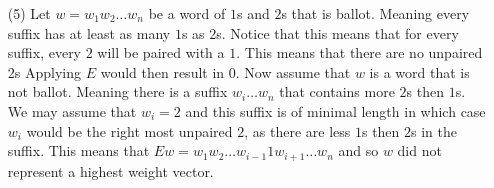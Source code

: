 \documentclass[12pt]{amsart}
\begin{document}
\begin{itemize}
     \item[(5)] %
     Let $w=w_1w_2\dots w_n$ be a word of $1$s and $2$s that is ballot. 
     Meaning every suffix has at least as many $1$s as $2$s. Notice that this 
     means that for every suffix, every $2$ will be paired with a $1$. 
     This means that there are no unpaired $2$s Applying $E$ would then result in $0$.
     Now assume that $w$ is a word that is not ballot. Meaning there is a suffix 
     $w_i\dots w_n$ that contains more $2$s then $1$s. We may assume that 
     $w_i=2$ and this suffix is of minimal length 
     in which case $w_i$ would be the right most unpaired $2$, as there are less 
     $1$s then $2$s 
     in the suffix. This means that $Ew=w_1w_2\dots w_{i-1}1w_{i+1}\dots w_n$ and 
     so $w$ did not represent a highest weight vector.

\end{itemize}
\end{document}
